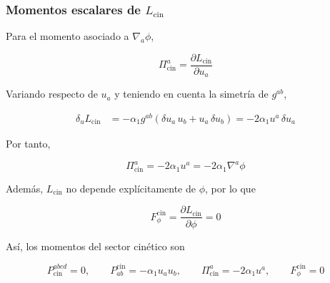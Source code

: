 \documentclass{beamer}
\newcommand{\DenseDisplaySpacing}{%
\setlength{\abovedisplayskip}{1pt}%
\setlength{\belowdisplayskip}{1pt}%
\setlength{\abovedisplayshortskip}{0pt}%
\setlength{\belowdisplayshortskip}{0pt}%
\setlength{\jot}{1pt}%
}
\begin{document}
\begin{frame}[label=nav-frame-093]
\frametitle{Momentos escalares de \(L_{\mathrm{cin}}\)}
\small
\linespread{.94}\selectfont\DenseDisplaySpacing

Para el momento asociado a \(\nabla_a\phi\),

\[
\Pi^a_{\mathrm{cin}}
=
\frac{\partial L_{\mathrm{cin}}}{\partial u_a}
\]

Variando respecto de \(u_a\) y teniendo en cuenta la simetría de $g^{ab}$,

\begin{align*}
\delta_u L_{\mathrm{cin}}
&=
-\alpha_1 g^{ab}
\left(
\delta u_a\,u_b
+
u_a\,\delta u_b
\right)=
-2\alpha_1u^a\,\delta u_a
\end{align*}

Por tanto,

\[
\Pi^a_{\mathrm{cin}}
=
-2\alpha_1u^a
=
-2\alpha_1\nabla^a\phi
\]

Además, \(L_{\mathrm{cin}}\) no depende explícitamente de \(\phi\), por lo que

\[
F_\phi^{\mathrm{cin}}
=
\frac{\partial L_{\mathrm{cin}}}{\partial\phi}
= 0
\]

Así, los momentos del sector cinético son

\[
\boxed{
P_{\mathrm{cin}}^{abcd}=0,
\qquad
P^{\mathrm{cin}}_{ab}=-\alpha_1u_a u_b,
\qquad
\Pi^a_{\mathrm{cin}}=-2\alpha_1u^a,
\qquad
F_\phi^{\mathrm{cin}}=0
}
\]

\end{frame}
\end{document}
